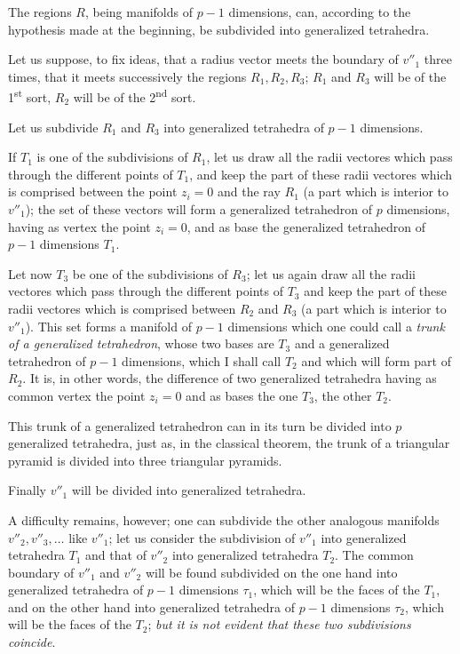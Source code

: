 \documentclass{article}
\begin{document}
The regions $R$, being manifolds of $p - 1$ dimensions, can, according to the hypothesis made at the beginning, be subdivided into generalized tetrahedra.

Let us suppose, to fix ideas, that a radius vector meets the boundary of $v''_{1}$ three times, that it meets successively the regions $R_{1}, R_{2}, R_{3}$; $R_{1}$ and $R_{3}$ will be of the 1\textsuperscript{st} sort, $R_{2}$ will be of the 2\textsuperscript{nd} sort.

Let us subdivide $R_{1}$ and $R_{3}$ into generalized tetrahedra of $p - 1$ dimensions.

If $T_{1}$ is one of the subdivisions of $R_{1}$, let us draw all the radii vectores which pass through the different points of $T_{1}$, and keep the part of these radii vectores which is comprised between the point $z_{i} = 0$ and the ray $R_{1}$ (a part which is interior to $v''_{1}$); the set of these vectors will form a generalized tetrahedron of $p$ dimensions, having as vertex the point $z_{i} = 0$, and as base the generalized tetrahedron of $p - 1$ dimensions $T_{1}$.


Let now $T_{3}$ be one of the subdivisions of $R_{3}$; let us again draw all the radii vectores which pass through the different points of $T_{3}$ and keep the part of these radii vectores which is comprised between $R_{2}$ and $R_{3}$ (a part which is interior to $v''_{1}$). This set forms a manifold of $p - 1$ dimensions which one could call a \emph{trunk of a generalized tetrahedron}, whose two bases are $T_{3}$ and a generalized tetrahedron of $p - 1$ dimensions, which I shall call $T_{2}$ and which will form part of $R_{2}$. It is, in other words, the difference of two generalized tetrahedra having as common vertex the point $z_{i} = 0$ and as bases the one $T_{3}$, the other $T_{2}$.

This trunk of a generalized tetrahedron can in its turn be divided into $p$ generalized tetrahedra, just as, in the classical theorem, the trunk of a triangular pyramid is divided into three triangular pyramids.

Finally $v''_{1}$ will be divided into generalized tetrahedra.

A difficulty remains, however; one can subdivide the other analogous manifolds $v''_{2}, v''_{3}, \ldots$ like $v''_{1}$; let us consider the subdivision of $v''_{1}$ into generalized tetrahedra $T_{1}$ and that of $v''_{2}$ into generalized tetrahedra $T_{2}$. The common boundary of $v''_{1}$ and $v''_{2}$ will be found subdivided on the one hand into generalized tetrahedra of $p - 1$ dimensions $\tau_{1}$, which will be the faces of the $T_{1}$, and on the other hand into generalized tetrahedra of $p - 1$ dimensions $\tau_{2}$, which will be the faces of the $T_{2}$; \emph{but it is not evident that these two subdivisions coincide}.
\end{document}
